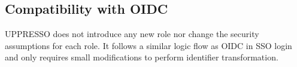\subsection{Compatibility with OIDC}
\label{subsec:compatible}
UPPRESSO does not introduce any new role nor change the security assumptions for each role. It follows a similar logic flow as OIDC in SSO login and only requires small modifications to perform identifier transformation.

